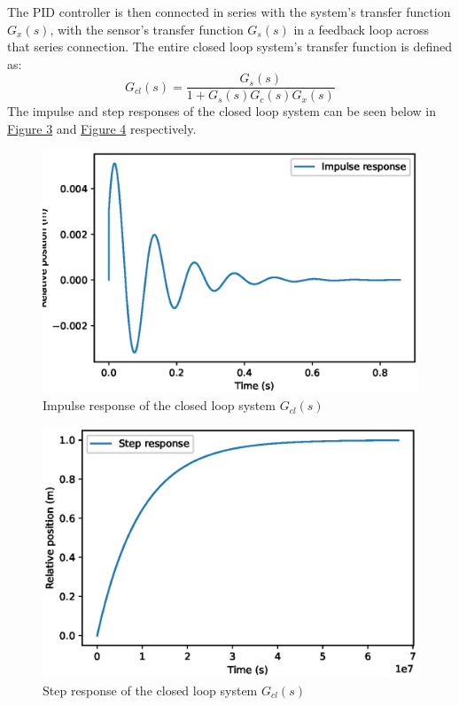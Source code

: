 \documentclass[a4paper,10pt,reqno]{amsart}
\numberwithin{equation}{section}
\begin{document}
The PID controller is then connected in series with the system's transfer function $G_x(s)$, with the sensor's transfer function $G_s(s)$ in a feedback loop across that series connection. The entire closed loop system's transfer function is defined as:
\begin{equation}
    G_{cl}(s)=\frac{G_s(s)}{1+G_s(s)G_c(s)G_x(s)}
\end{equation}
The impulse and step responses of the closed loop system can be seen below in \hyperref[fig:pid-impulse]{Figure 3} and \hyperref[fig:pid-step]{Figure 4} respectively.
\begin{figure}[h]
\centering
\includegraphics[width=0.6\linewidth]{g-load-impulse.eps}
\caption{Impulse response of the closed loop system $G_{cl}(s)$}
\label{fig:pid-impulse}
\end{figure}
\begin{figure}[!h]
\centering
\includegraphics[width=0.6\linewidth]{g-load-step.eps}
\caption{Step response of the closed loop system $G_{cl}(s)$}
\label{fig:pid-step}
\end{figure}


\end{document}
